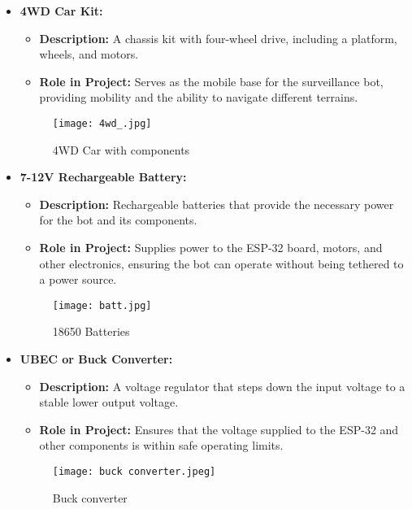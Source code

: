 \documentclass[12pt]{article}
\begin{document}
\begin{itemize}
    \item \textbf{4WD Car Kit:}
    \begin{itemize}
        \item \textbf{Description:} A chassis kit with four-wheel drive, including a platform, wheels, and motors.
        \item \textbf{Role in Project:} Serves as the mobile base for the surveillance bot, providing mobility and the ability to navigate different terrains.
    \end{itemize}
    \begin{figure}[h]
        \centering
        \texttt{[image: 4wd\_.jpg]}
        \caption{4WD Car with components}
        \label{fig:enter-label}
    \end{figure}
    \newpage
    \item \textbf{7-12V Rechargeable Battery:}
    \begin{itemize}
        \item \textbf{Description:} Rechargeable batteries that provide the necessary power for the bot and its components.
        \item \textbf{Role in Project:} Supplies power to the ESP-32 board, motors, and other electronics, ensuring the bot can operate without being tethered to a power source.
    \end{itemize}
    \begin{figure}[h]
        \centering
        \texttt{[image: batt.jpg]}
        \caption{18650 Batteries}
        \label{fig:enter-label}
    \end{figure}

    \item \textbf{UBEC or Buck Converter:}
    \begin{itemize}
        \item \textbf{Description:} A voltage regulator that steps down the input voltage to a stable lower output voltage.
        \item \textbf{Role in Project:} Ensures that the voltage supplied to the ESP-32 and other components is within safe operating limits.
    \end{itemize}
    \begin{figure}[h]
        \centering
        \texttt{[image: buck converter.jpeg]}
        \caption{Buck converter}
        \label{fig:enter-label}
    \end{figure}


\end{itemize}
\end{document}
